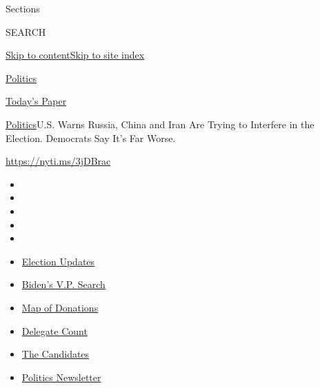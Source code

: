 Sections

SEARCH

\protect\hyperlink{site-content}{Skip to
content}\protect\hyperlink{site-index}{Skip to site index}

\href{https://www.nytimes.com/section/politics}{Politics}

\href{https://myaccount.nytimes.com/auth/login?response_type=cookie\&client_id=vi}{}

\href{https://www.nytimes.com/section/todayspaper}{Today's Paper}

\href{/section/politics}{Politics}\textbar{}U.S. Warns Russia, China and
Iran Are Trying to Interfere in the Election. Democrats Say It's Far
Worse.

\url{https://nyti.ms/3jDBrac}

\begin{itemize}
\item
\item
\item
\item
\item
\end{itemize}

\begin{itemize}
\item
  \href{https://www.nytimes.com/2020/07/31/us/elections/biden-vs-trump.html?action=click\&pgtype=Article\&state=default\&region=TOP_BANNER\&context=storylines_menu}{Election
  Updates}
\item
  \href{https://www.nytimes.com/article/biden-vice-president-2020.html?action=click\&pgtype=Article\&state=default\&region=TOP_BANNER\&context=storylines_menu}{Biden's
  V.P. Search}
\item
  \href{https://www.nytimes.com/interactive/2020/07/24/us/politics/trump-biden-campaign-donors.html?action=click\&pgtype=Article\&state=default\&region=TOP_BANNER\&context=storylines_menu}{Map
  of Donations}
\item
  \href{https://www.nytimes.com/interactive/2020/us/elections/delegate-count-primary-results.html?action=click\&pgtype=Article\&state=default\&region=TOP_BANNER\&context=storylines_menu}{Delegate
  Count}
\item
  \href{https://www.nytimes.com/interactive/2019/us/politics/2020-presidential-candidates.html?action=click\&pgtype=Article\&state=default\&region=TOP_BANNER\&context=storylines_menu}{The
  Candidates}
\item
  \href{https://www.nytimes.com/newsletters/politics?action=click\&pgtype=Article\&state=default\&region=TOP_BANNER\&context=storylines_menu}{Politics
  Newsletter}
\end{itemize}

